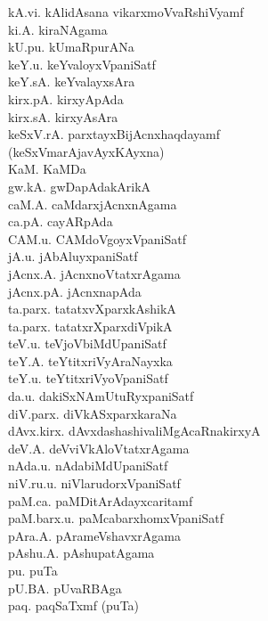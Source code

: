 {\begin{multicols}{2}
\begin{tabbing}
kA.vi. \> kAlidAsana vikarxmoVvaRshiVyamf\\[2pt]
ki.A. \> kiraNAgama\\[2pt]
kU.pu. \> kUmaRpurANa\\[2pt]
keY.u. \> keYvaloyxVpaniSatf\\[2pt]
keY.sA. \> keYvalayxsAra\\[2pt]
kirx.pA. \> kirxyApAda\\[2pt]
kirx.sA. \> kirxyAsAra\\[2pt]
keSxV.rA. \> parxtayxBijAcnxhaqdayamf\\[2pt]
(keSxVmarAjavAyxKAyxna) \> \\[2pt]
KaM. \> KaMDa\\[2pt]
gw.kA. \> gwDapAdakArikA\\[2pt]
caM.A. \> caMdarxjAcnxnAgama\\[2pt]
ca.pA. \> cayARpAda\\[2pt]
CAM.u. \> CAMdoVgoyxVpaniSatf\\[2pt]
jA.u. \> jAbAluyxpaniSatf\\[2pt]
jAcnx.A. \> jAcnxnoVtatxrAgama\\[2pt]
jAcnx.pA. \> jAcnxnapAda\\[2pt]
ta.parx. \> tatatxvXparxkAshikA\\[2pt]
ta.parx. \> tatatxrXparxdiVpikA\\[2pt]
teV.u. \> teVjoVbiMdUpaniSatf\\[2pt]
teY.A. \> teYtitxriVyAraNayxka\\[2pt]
teY.u. \> teYtitxriVyoVpaniSatf\\[2pt]
da.u. \> dakiSxNAmUtuRyxpaniSatf\\[2pt]
diV.parx. \> diVkASxparxkaraNa\\[2pt]
dAvx.kirx. \> dAvxdashashivaliMgAcaRnakirxyA\\[2pt]
deV.A. \> deVviVkAloVtatxrAgama\\[2pt]
nAda.u. \> nAdabiMdUpaniSatf\\[2pt]
niV.ru.u. \> niVlarudorxVpaniSatf\\[2pt]
paM.ca. \> paMDitArAdayxcaritamf\\[2pt]
paM.barx.u. \> paMcabarxhomxVpaniSatf\\[2pt]
pAra.A. \> pArameVshavxrAgama\\[2pt]
pAshu.A. \> pAshupatAgama\\[2pt]
pu. \> puTa\\[2pt]
pU.BA. \> pUvaRBAga\\[2pt]
paq. \> paqSaTxmf (puTa)\\[2pt]

\end{tabbing}
\end{multicols}}
